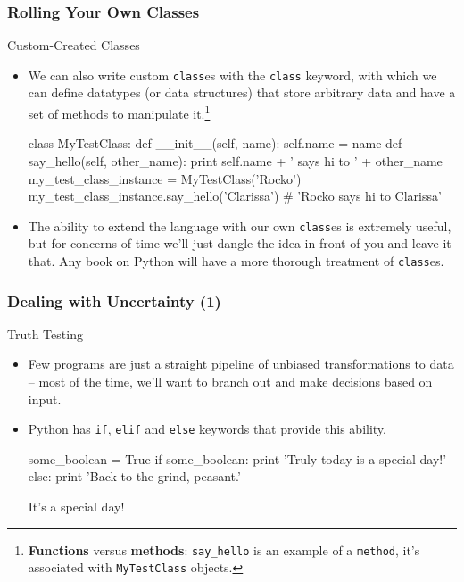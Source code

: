 \documentclass[10pt]{beamer}
\begin{document}
\begin{frame}[fragile]
  \frametitle{Rolling Your Own Classes}
  \begin{block}{Custom-Created Classes}
    \begin{itemize}
      \item We can also write custom \texttt{class}es with the \texttt{class} keyword, with which we can define datatypes (or data structures) that store arbitrary data and have a set of methods to manipulate it.\footnote{\textbf{Functions} versus \textbf{methods}: \texttt{say\_hello} is an example of a \texttt{method}, it's associated with \texttt{MyTestClass} objects.}
        \footnotesize
        \begin{pythoncode}
  class MyTestClass:
    def __init__(self, name):
      self.name = name
    def say_hello(self, other_name):
      print self.name + ' says hi to ' + other_name
  my_test_class_instance = MyTestClass('Rocko')
  my_test_class_instance.say_hello('Clarissa')
  # 'Rocko says hi to Clarissa'
        \end{pythoncode}
      \normalsize
      \item The ability to extend the language with our own \texttt{class}es is extremely useful, but for concerns of time we'll just dangle the idea in front of you and leave it that.
        Any book on Python will have a more thorough treatment of \texttt{class}es.
    \end{itemize}
  \end{block}
\end{frame}
      

\begin{frame}[fragile]
  \frametitle{Dealing with Uncertainty (1)}
  \begin{block}{Truth Testing}
    \begin{itemize}
      \item Few programs are just a straight pipeline of unbiased transformations to data -- most of the time, we'll want to branch out and make decisions based on input.
      \item Python has \texttt{if}, \texttt{elif} and \texttt{else} keywords that provide this ability.
      \begin{pythoncode}
  some_boolean = True
  if some_boolean:
    print 'Truly today is a special day!'
  else:
    print 'Back to the grind, peasant.'
      \end{pythoncode}
      It's a special day!
    \end{itemize}
  \end{block}
\end{frame}
      
\end{document}
